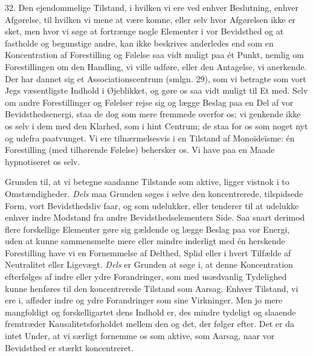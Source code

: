 \documentclass[12pt,a4paper,openany]{book}
\newcommand{\opage}[1]{\marginnote{\footnotesize\textit{[#1]}}}
\begin{document}
\setcounter{footnote}{0}%
\opage{73}32. Den ejendommelige Tilstand, i hvilken vi ere ved enhver
Beslutning, enhver Afgørelse, til hvilken vi mene at være komne, eller selv
hvor Afgørelsen ikke er sket, men hvor vi søge at fortrænge nogle Elementer i
vor Bevidsthed og at fastholde og begunstige andre, kan ikke beskrives
anderledes end som en Koncentration af Forestilling og Følelse saa vidt muligt
paa ét Punkt, nemlig om Forestillingen om den Handling, vi ville udføre, eller
den Antagelse, vi anerkende. Der har dannet sig et Associationscentrum (smlgn.
29), som vi betragte som vort Jegs væsentligste Indhold i Øjeblikket, og gøre
os saa vidt muligt til Et med. Selv om andre Forestillinger og Følelser rejse
sig og lægge Beslag paa en Del af vor Bevidsthedsenergi, staa de dog som mere
fremmede overfor os; vi genkende ikke os selv i dem med den Klarhed, som i hint
Centrum; de staa for os som noget nyt og udefra paatvunget. Vi ere
tilnærmelsesvis i en Tilstand af Monoïdeïsme: én Forestilling (med tilhørende
Følelse) behersker os. Vi have paa en Maade hypnotiseret os selv.

Grunden til, at vi betegne saadanne Tilstande som aktive, ligger vistnok i to
Omstændigheder. \emph{Dels} maa Grunden søges i selve den koncentrerede,
tilspidsede Form, vort Bevidsthedsliv faar, og som udelukker, eller tenderer
til at udelukke enhver indre Modstand fra andre Bevidsthedselementers Side. Saa
snart derimod flere forskellige Elementer gøre sig gældende og lægge Beslag paa
vor Energi, uden at kunne sammensmelte mere eller mindre inderligt med én
herskende Forestilling have vi en Fornemmelse af Delthed, Splid eller i hvert
Tilfælde af Neutralitet eller Ligevægt. \emph{Dels} er Grunden at søge i, at
denne Koncentration efterfølges af indre eller ydre Forandringer, som med
usædvanlig Tydelighed kunne henføres til den koncentrerede Tilstand som Aarsag.
Enhver Tilstand, vi ere i, afføder indre og ydre Forandringer som sine
Virkninger. Men jo mere mangfoldigt og forskelligartet dens Indhold er, des
mindre tydeligt og slaaende fremtræder Kausalitetsforholdet mellem den og det,
der følger efter. Det er da intet Under, at vi særligt fornemme os som aktive,
som Aarsag, naar vor Bevidsthed er stærkt koncentreret.
\end{document}
